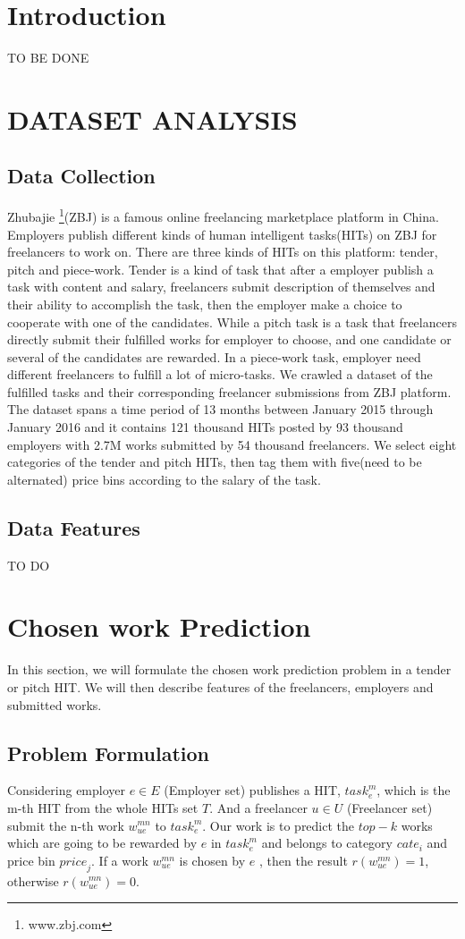
\section{Introduction}
TO BE DONE
\section{DATASET ANALYSIS}
\subsection{Data Collection}
Zhubajie \footnote{\label{footnote1}www.zbj.com}(ZBJ) is a famous online freelancing marketplace platform in China. Employers publish different kinds of human intelligent tasks(HITs) on  ZBJ for freelancers to work on. There are three kinds of HITs on this platform: tender, pitch and piece-work. Tender  is a kind of task that after a employer publish a task with content and salary, freelancers submit description of themselves and their ability to accomplish the task, then the employer make a choice to cooperate with one of the candidates. While a pitch task is a task that freelancers directly submit their fulfilled works for employer to choose, and one candidate or several of the candidates are rewarded. In a piece-work task, employer need different freelancers to fulfill a lot of micro-tasks. We crawled a dataset of the fulfilled tasks and their corresponding freelancer submissions from ZBJ platform. The dataset spans a time period of 13 months between January 2015 through January 2016 and it contains 121 thousand HITs posted by 93 thousand employers with 2.7M works submitted by 54 thousand freelancers. We select eight categories of the tender and pitch HITs, then tag them with five(need to be alternated) price bins according to the salary of the task.
\subsection{Data Features} TO DO
\section{ Chosen work Prediction}
In this section, we will formulate the chosen work prediction problem in a tender or pitch HIT. We will then describe features of the freelancers, employers and submitted works.
\subsection{Problem Formulation}
Considering employer $e \in E$ (Employer set) publishes a HIT, ${task}_{e}^{m}$, which is the m-th HIT  from the  whole HITs set $T$. And a freelancer $u \in U$ (Freelancer set) submit the n-th work ${w}_{ue}^{mn}$ to ${task}_{e}^{m}$. Our work is to predict the $top-k$ works which are going to be rewarded by $e$ in ${task}_{e}^{m}$ and belongs to category ${cate}_{i}$ and price bin ${price}_{j}$. If a work ${w}_{ue}^{mn}$ is chosen by $e$ , then the result $r({w}_{ue}^{mn})=1$, otherwise $r({w}_{ue}^{mn})=0$.
